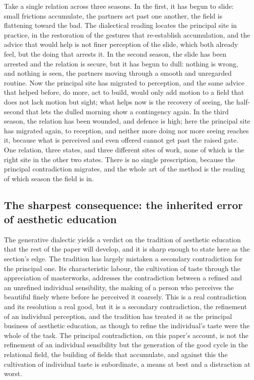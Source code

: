\begin{casebox}
Take a single relation across three seasons. In the first, it has begun to slide: small frictions accumulate, the partners act past one another, the field is flattening toward the bad. The dialectical reading locates the principal site in practice, in the restoration of the gestures that re-establish accumulation, and the advice that would help is not finer perception of the slide, which both already feel, but the doing that arrests it. In the second season, the slide has been arrested and the relation is secure, but it has begun to dull: nothing is wrong, and nothing is seen, the partners moving through a smooth and unregarded routine. Now the principal site has migrated to perception, and the same advice that helped before, do more, act to build, would only add motion to a field that does not lack motion but sight; what helps now is the recovery of seeing, the half-second that lets the dulled morning show a contingency again. In the third season, the relation has been wounded, and defence is high; here the principal site has migrated again, to reception, and neither more doing nor more seeing reaches it, because what is perceived and even offered cannot get past the raised gate. One relation, three states, and three different sites of work, none of which is the right site in the other two states. There is no single prescription, because the principal contradiction migrates, and the whole art of the method is the reading of which season the field is in.
\end{casebox}

\subsection{The sharpest consequence: the inherited error of aesthetic education}
\label{p22:sub:method-inherited-error}

The generative dialectic yields a verdict on the tradition of aesthetic education that the rest of the paper will develop, and it is sharp enough to state here as the section's edge. The tradition has largely mistaken a secondary contradiction for the principal one. Its characteristic labour, the cultivation of taste through the appreciation of masterworks, addresses the contradiction between a refined and an unrefined individual sensibility, the making of a person who perceives the beautiful finely where before he perceived it coarsely. This is a real contradiction and its resolution a real good, but it is a secondary contradiction, the refinement of an individual perception, and the tradition has treated it as the principal business of aesthetic education, as though to refine the individual's taste were the whole of the task. The principal contradiction, on this paper's account, is not the refinement of an individual sensibility but the generation of the good cycle in the relational field, the building of fields that accumulate, and against this the cultivation of individual taste is subordinate, a means at best and a distraction at worst.

